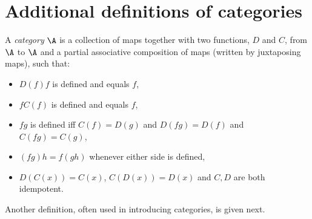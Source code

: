 \chapter{Additional definitions of categories}
\begin{definition}\label{def:category_alt}
  A \emph{category} $\A$ is a collection of maps together with two functions, $D$ and $C$, from
  $\A$ to $\A$ and a partial associative composition of maps (written by juxtaposing maps), such
  that:
  \begin{itemize}
    \item[\cataltone] $D(f) f$ is defined and equals $f$,
    \item[\catalttwo] $f C(f)$ is defined and equals $f$,
    \item[\cataltthree] $f g$ is defined iff $C(f) = D(g)$ and $D(f g) = D(f)$ and $C(f g) = C(g)$,
    \item[\cataltfour] $(f g) h = f (g h)$ whenever either side is defined,
    \item[\cataltfive] $D(C(x)) = C(x)$, $C(D(x)) = D(x)$ and $C,D$ are both idempotent.
  \end{itemize}
\end{definition}

Another definition, often used in introducing categories, is given next.

